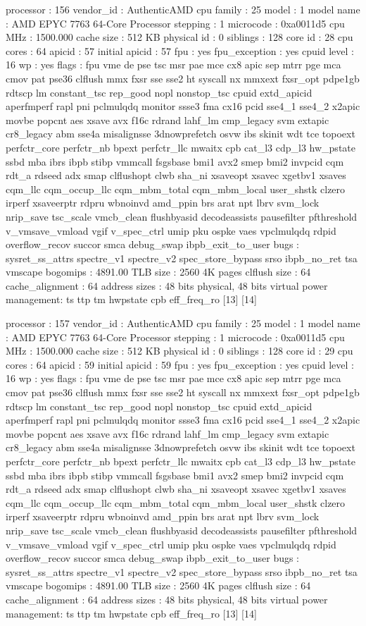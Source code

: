 processor	: 156
vendor_id	: AuthenticAMD
cpu family	: 25
model		: 1
model name	: AMD EPYC 7763 64-Core Processor
stepping	: 1
microcode	: 0xa0011d5
cpu MHz		: 1500.000
cache size	: 512 KB
physical id	: 0
siblings	: 128
core id		: 28
cpu cores	: 64
apicid		: 57
initial apicid	: 57
fpu		: yes
fpu_exception	: yes
cpuid level	: 16
wp		: yes
flags		: fpu vme de pse tsc msr pae mce cx8 apic sep mtrr pge mca cmov pat pse36 clflush mmx fxsr sse sse2 ht syscall nx mmxext fxsr_opt pdpe1gb rdtscp lm constant_tsc rep_good nopl nonstop_tsc cpuid extd_apicid aperfmperf rapl pni pclmulqdq monitor ssse3 fma cx16 pcid sse4_1 sse4_2 x2apic movbe popcnt aes xsave avx f16c rdrand lahf_lm cmp_legacy svm extapic cr8_legacy abm sse4a misalignsse 3dnowprefetch osvw ibs skinit wdt tce topoext perfctr_core perfctr_nb bpext perfctr_llc mwaitx cpb cat_l3 cdp_l3 hw_pstate ssbd mba ibrs ibpb stibp vmmcall fsgsbase bmi1 avx2 smep bmi2 invpcid cqm rdt_a rdseed adx smap clflushopt clwb sha_ni xsaveopt xsavec xgetbv1 xsaves cqm_llc cqm_occup_llc cqm_mbm_total cqm_mbm_local user_shstk clzero irperf xsaveerptr rdpru wbnoinvd amd_ppin brs arat npt lbrv svm_lock nrip_save tsc_scale vmcb_clean flushbyasid decodeassists pausefilter pfthreshold v_vmsave_vmload vgif v_spec_ctrl umip pku ospke vaes vpclmulqdq rdpid overflow_recov succor smca debug_swap ibpb_exit_to_user
bugs		: sysret_ss_attrs spectre_v1 spectre_v2 spec_store_bypass srso ibpb_no_ret tsa vmscape
bogomips	: 4891.00
TLB size	: 2560 4K pages
clflush size	: 64
cache_alignment	: 64
address sizes	: 48 bits physical, 48 bits virtual
power management: ts ttp tm hwpstate cpb eff_freq_ro [13] [14]

processor	: 157
vendor_id	: AuthenticAMD
cpu family	: 25
model		: 1
model name	: AMD EPYC 7763 64-Core Processor
stepping	: 1
microcode	: 0xa0011d5
cpu MHz		: 1500.000
cache size	: 512 KB
physical id	: 0
siblings	: 128
core id		: 29
cpu cores	: 64
apicid		: 59
initial apicid	: 59
fpu		: yes
fpu_exception	: yes
cpuid level	: 16
wp		: yes
flags		: fpu vme de pse tsc msr pae mce cx8 apic sep mtrr pge mca cmov pat pse36 clflush mmx fxsr sse sse2 ht syscall nx mmxext fxsr_opt pdpe1gb rdtscp lm constant_tsc rep_good nopl nonstop_tsc cpuid extd_apicid aperfmperf rapl pni pclmulqdq monitor ssse3 fma cx16 pcid sse4_1 sse4_2 x2apic movbe popcnt aes xsave avx f16c rdrand lahf_lm cmp_legacy svm extapic cr8_legacy abm sse4a misalignsse 3dnowprefetch osvw ibs skinit wdt tce topoext perfctr_core perfctr_nb bpext perfctr_llc mwaitx cpb cat_l3 cdp_l3 hw_pstate ssbd mba ibrs ibpb stibp vmmcall fsgsbase bmi1 avx2 smep bmi2 invpcid cqm rdt_a rdseed adx smap clflushopt clwb sha_ni xsaveopt xsavec xgetbv1 xsaves cqm_llc cqm_occup_llc cqm_mbm_total cqm_mbm_local user_shstk clzero irperf xsaveerptr rdpru wbnoinvd amd_ppin brs arat npt lbrv svm_lock nrip_save tsc_scale vmcb_clean flushbyasid decodeassists pausefilter pfthreshold v_vmsave_vmload vgif v_spec_ctrl umip pku ospke vaes vpclmulqdq rdpid overflow_recov succor smca debug_swap ibpb_exit_to_user
bugs		: sysret_ss_attrs spectre_v1 spectre_v2 spec_store_bypass srso ibpb_no_ret tsa vmscape
bogomips	: 4891.00
TLB size	: 2560 4K pages
clflush size	: 64
cache_alignment	: 64
address sizes	: 48 bits physical, 48 bits virtual
power management: ts ttp tm hwpstate cpb eff_freq_ro [13] [14]


